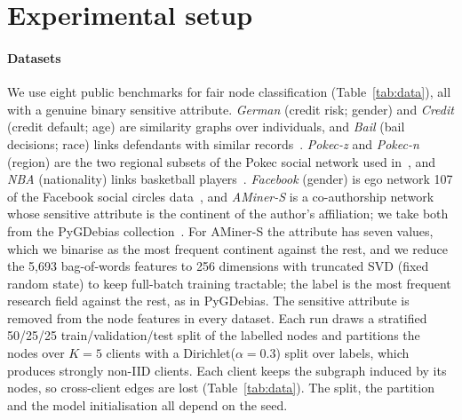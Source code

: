 \section{Experimental setup}\label{sec:setup}

\paragraph{Datasets}
We use eight public benchmarks for fair node classification (Table~\ref{tab:data}), all with a genuine binary sensitive attribute. \emph{German} (credit risk; gender) and \emph{Credit} (credit default; age) are similarity graphs over individuals, and \emph{Bail} (bail decisions; race) links defendants with similar records~\citep{agarwal2021towards}. \emph{Pokec-z} and \emph{Pokec-n} (region) are the two regional subsets of the Pokec social network used in~\citep{dai2021say}, and \emph{NBA} (nationality) links basketball players~\citep{dai2021say}. \emph{Facebook} (gender) is ego network 107 of the Facebook social circles data~\citep{mcauley2012learning}, and \emph{AMiner-S} is a co-authorship network whose sensitive attribute is the continent of the author's affiliation; we take both from the PyGDebias collection~\citep{dong2023fairness}. For AMiner-S the attribute has seven values, which we binarise as the most frequent continent against the rest, and we reduce the 5{,}693 bag-of-words features to 256 dimensions with truncated SVD (fixed random state) to keep full-batch training tractable; the label is the most frequent research field against the rest, as in PyGDebias. The sensitive attribute is removed from the node features in every dataset. Each run draws a stratified 50/25/25 train/validation/test split of the labelled nodes and partitions the nodes over $K=5$ clients with a Dirichlet($\alpha=0.3$) split over labels, which produces strongly non-IID clients. Each client keeps the subgraph induced by its nodes, so cross-client edges are lost (Table~\ref{tab:data}). The split, the partition and the model initialisation all depend on the seed.

